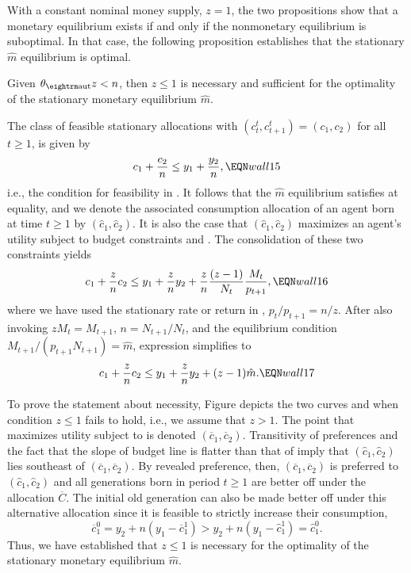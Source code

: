 \medskip
With a constant nominal money supply, $z=1$, the two
propositions show that a monetary equilibrium exists if and only
if the nonmonetary equilibrium is suboptimal. In that case, the
following proposition establishes that the stationary $\hat m$
equilibrium is optimal.

\medskip
{}  Given $\theta_{\rm aut} z < n$, then
$z \leq 1$ is necessary and sufficient for the optimality of the
stationary monetary equilibrium $\hat m$.
\medskip

The class of feasible stationary allocations with
$(c^t_t,c^t_{t+1}) = (c_1,c_2)$ for all $t\geq 1$, is given by
$$
c_1 + {c_2 \over n} \leq y_1 + {y_2 \over n},        \EQN wall15
$$
i.e., the condition for feasibility in . It follows that
the $\hat m$ equilibrium satisfies  at equality, and
we denote the associated consumption allocation of an agent born
at time $t\geq 1$ by $(\hat c_1, \hat c_2)$. It is also the case
that $(\hat c_1, \hat c_2)$ maximizes an agent's utility subject
to budget constraints  and .
The consolidation of these two constraints yields
$$
c_1 + {z \over n} c_2 \leq y_1 + {z \over n} y_2
    +  {z \over n} {(z-1) \over N_t} {M_t \over p_{t+1} },
                                                     \EQN wall16
$$
where we have used the stationary rate or return in ,
$p_t/p_{t+1}=n/z$. After also invoking $z M_t=M_{t+1}$,
$n=N_{t+1}/N_t$, and the equilibrium condition
$M_{t+1}/(p_{t+1} N_{t+1})= \hat m$, expression 
simplifies to
$$
c_1 + {z \over n} c_2 \leq y_1 + {z \over n} y_2 + (z-1) \hat m.
                                                      \EQN wall17
$$

To prove the statement about necessity, Figure  %
depicts the two curves
 and  when condition $z \leq 1$ fails to hold,
i.e., we assume that $z>1$. The point that maximizes utility subject
to  is denoted $(\overline c_1, \overline c_2)$.
Transitivity of preferences  and the fact that the
slope of budget line  is flatter than that of 
imply that $(\hat c_1, \hat c_2)$ lies southeast of
$(\overline c_1, \overline c_2)$. By revealed preference, then,
$(\overline c_1, \overline c_2)$ is preferred to
$(\hat c_1, \hat c_2)$ and all generations born in period $t \geq 1$
are better off under the allocation $\overline C$.
The initial old generation can also be made better off under this
alternative allocation since it is feasible to strictly
increase their consumption,
$$
\overline c^0_1 = y_2 + n(y_1 - \overline c^1_1)
                > y_2 + n(y_1 - \hat c^1_1) = \hat c^0_1.
$$
Thus, we have established that $z \leq 1$ is necessary for the
optimality of the stationary monetary equilibrium $\hat m$.

